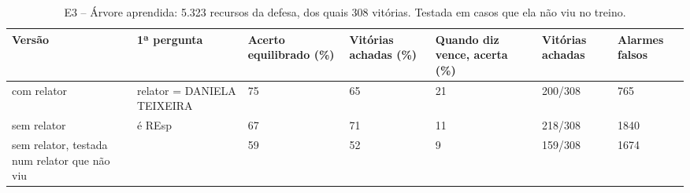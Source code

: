 \begin{table}[h]
\centering\small
\caption{E3 -- Árvore aprendida: 5.323 recursos da defesa, dos quais 308 vitórias. Testada em casos que ela não viu no treino.}
\label{tab:e3}
\begin{adjustbox}{max width=\textwidth}
\begin{tabular}{p{3.4cm}lp{1.6cm}p{1.6cm}p{1.9cm}p{1.4cm}p{1.3cm}}
\toprule
Versão & 1ª pergunta & Acerto equilibrado (\%) & Vitórias achadas (\%) & Quando diz vence, acerta (\%) & Vitórias achadas & Alarmes falsos \\
\midrule
com relator & relator = DANIELA TEIXEIRA & 75 & 65 & 21 & 200/308 & 765 \\
sem relator & é REsp & 67 & 71 & 11 & 218/308 & 1840 \\
sem relator, testada num relator que não viu &  & 59 & 52 & 9 & 159/308 & 1674 \\
\bottomrule
\end{tabular}
\end{adjustbox}
\end{table}
